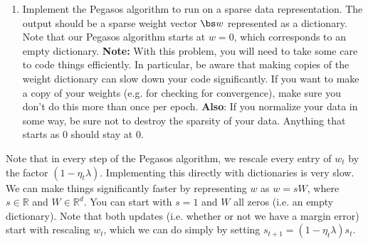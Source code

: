 \documentclass{article}
\theoremstyle{plain}
\theoremstyle{definition}
\begin{document}
\begin{enumerate}
  \setcounter{enumi}{\value{saveenum}}
\item Implement the Pegasos algorithm to run on a sparse data representation.
The output should be a sparse weight vector $\bs w$ represented as a dictionary. Note that our Pegasos
algorithm starts at $w=0$, which corresponds
to an empty dictionary. \textbf{Note:} With this problem, you will
need to take some care to code things efficiently. In particular,
be aware that making copies of the weight dictionary can slow down
your code significantly. If you want to make a copy of your weights
(e.g. for checking for convergence), make sure you don't do this more
than once per epoch. \textbf{Also}: If you normalize your data in
some way, be sure not to destroy the sparsity of your data. Anything
that starts as $0$ should stay at $0$.\\
\setcounter{saveenum}{\value{enumi}}
\end{enumerate}
Note that in every step of the Pegasos algorithm, we rescale every
entry of $w_{t}$ by the factor $(1-\eta_{t}\lambda)$. Implementing
this directly with dictionaries is very slow. We can make things significantly
faster by representing $w$ as $w=sW$, where $s\in\mathbb{R}$ and $W\in\mathbb{R}^{d}$.
You can start with $s=1$ and $W$ all zeros (i.e. an empty dictionary).
Note that both updates (i.e. whether or not we have a margin error)
start with rescaling $w_{t}$, which we can do simply by setting $s_{t+1}=\left(1-\eta_{t}\lambda\right)s_{t}$.
\end{document}
